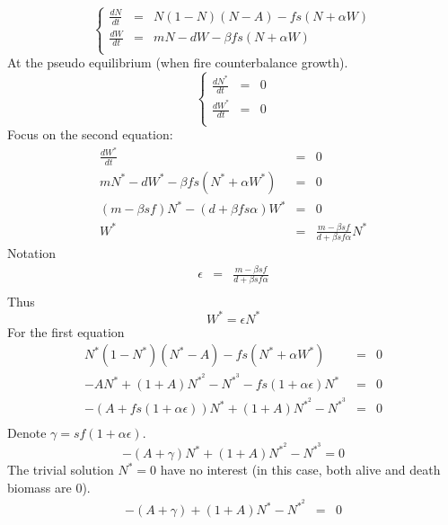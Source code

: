 \documentclass{article}
\begin{document}
\[
\left\lbrace
\begin{array}{rcl}
\frac{dN}{dt} & = & N(1-N)(N-A) - f s (N+\alpha W) \\
\frac{dW}{dt} & = & mN -dW - \beta f s (N+\alpha W) \\
\end{array}
\right.
\]
At the pseudo equilibrium (when fire counterbalance growth).
\[
\left\lbrace
\begin{array}{rcl}
\frac{dN^*}{dt} & = & 0 \\
\frac{dW^*}{dt} & = & 0 \\
\end{array}
\right.
\]
Focus on the second equation: 
\[
\begin{array}{rcl}
\frac{dW^*}{dt} & = & 0 \\
mN^*-dW^* -\beta f s (N^*+\alpha W^*) & = & 0 \\
(m-\beta s f)N^* - (d+\beta f s \alpha) W^* & = & 0 \\
W^* & = & \frac{m-\beta s f}{d + \beta s f \alpha} N^*
\end{array}
\]
Notation
\[
\begin{array}{rcl}
\epsilon & = & \frac{m-\beta s f}{d + \beta s f \alpha} \\
\end{array}
\]
Thus
\[
W^* = \epsilon N^*
\]
For the first equation
\[
\begin{array}{rcl}
N^*(1-N^*)(N^*-A) - f s (N^*+\alpha W^*) & = & 0 \\
-AN^*+(1+A)N^{*^2}-N^{*^3} -f s (1+\alpha\epsilon)N^* & = & 0 \\
-(A+f s (1+\alpha\epsilon))N^*+(1+A)N^{*^2}-N^{*^3} & = & 0 \\
\end{array}
\]
Denote $\gamma = sf(1+\alpha\epsilon)$. 
\begin{equation}
-(A+\gamma)N^*+(1+A)N^{*^2}-N^{*^3} = 0
\end{equation}
The trivial solution $N^* = 0$ have no interest (in this case, both alive and death biomass are $0$).
\[
\begin{array}{rcl}
-(A+\gamma)+(1+A)N^{*}-N^{*^2} & = & 0 \\
\end{array}
\]
\end{document}
